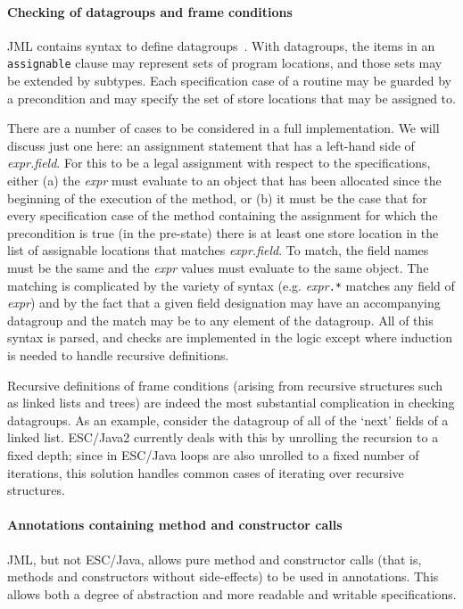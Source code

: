 \documentclass{llncs}
\begin{document}
\paragraph*{Checking of datagroups and frame conditions}
JML contains syntax to define 
datagroups~\cite{Leino-Poetzsch-Heffter-Zhou02}.  With datagroups, the items in
an \texttt{assignable} clause may represent sets of program locations,
and those sets may be extended by subtypes.  Each
specification case of a routine may be guarded by a
precondition and may specify the set of store locations that may be
assigned to.

There are a number of cases to be considered in a full implementation.
We will discuss just one here: an assignment statement that has a
left-hand side of \textit{expr.field}.  For this to be a legal
assignment with respect to the specifications, either (a) the
\textit{expr} must evaluate to an object that has been allocated since
the beginning of the execution of the method, or (b) it must be the
case that for every specification case of the method containing the
assignment for which the precondition is true (in the pre-state) there
is at least one store location in the list of assignable locations
that matches \textit{expr.field}.  To match, the field names must be
the same and the \textit{expr} values must evaluate to the same
object.  The matching is complicated by the variety of syntax (e.g.
\textit{expr}\texttt{.*} matches any field of \textit{expr}) and by
the fact that a given field designation may have an accompanying
datagroup and the match may be to any element of the datagroup.
All of this syntax is parsed, and checks are implemented in the logic except
where induction is needed to handle recursive definitions.

Recursive definitions of frame conditions (arising from recursive
structures such as linked lists and trees) are indeed the most
substantial complication in checking datagroups.  As an example,
consider the datagroup of all of the `next' fields of a linked list.
ESC/Java2 currently deals with this by unrolling the recursion to a
fixed depth; since in ESC/Java loops are also unrolled to a fixed
number of iterations, this solution handles common cases of iterating
over recursive structures.

\paragraph*{Annotations containing method and constructor calls}
JML, but not ESC/Java, allows pure method and constructor calls (that
is, methods and constructors without side-effects) to be used in
annotations.  This allows both a degree of abstraction and more
readable and writable specifications.
\end{document}
